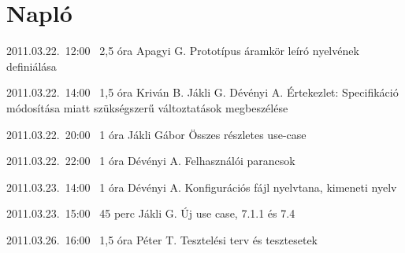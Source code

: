 %
\section{Napló}

\begin{naplo}

\bejegyzes
{2011.03.22.~12:00~} %
{2,5 óra} %
{Apagyi G.} %
{Prototípus áramkör leíró nyelvének definiálása} %

\bejegyzes
{2011.03.22.~14:00~}
{1,5 óra}
{Kriván B.\newline
Jákli G.\newline
Dévényi A.}
{Értekezlet: Specifikáció módosítása miatt szükségszerű változtatások megbeszélése}

\bejegyzes
{2011.03.22.~20:00~}
{1 óra}
{Jákli Gábor}
{Összes részletes use-case}

\bejegyzes
{2011.03.22.~22:00~}
{1 óra}
{Dévényi A.}
{Felhasználói parancsok}

\bejegyzes
{2011.03.23.~14:00~}
{1 óra}
{Dévényi A.}
{Konfigurációs fájl nyelvtana, kimeneti nyelv}

\bejegyzes
{2011.03.23.~15:00~}
{45 perc}
{Jákli G.}
{Új use case, 7.1.1 és 7.4}

\bejegyzes
{2011.03.26.~16:00~}
{1,5 óra}
{Péter T.}
{Tesztelési terv és tesztesetek}

\end{naplo}


